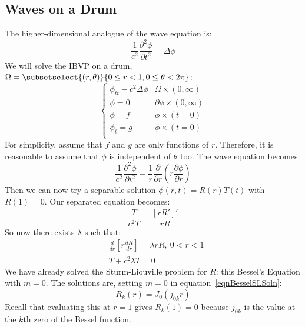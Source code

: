 \documentclass[../Main.tex]{subfiles}
\begin{document}
\subsection{Waves on a Drum}
The higher-dimensional analogue of the wave equation is:
\begin{equation}
    \frac{1}{c^2} \frac{\partial^{2}\phi}{\partial t^{2}} = \Delta \phi
    \label{eqnWave3D}
\end{equation}
We will solve the IBVP on a drum, $\Omega = \subsetselect{(r, \theta)}{0 \leq r < 1, 0 \leq \theta < 2\pi}$:
\begin{equation}
    \begin{cases}
        \phi_{tt} - c^2 \Delta \phi & \Omega \times (0, \infty) \\
        \phi = 0 & \partial \phi \times (0, \infty) \\
        \phi = f & \phi \times (t = 0) \\
        \phi_t = g & \phi \times (t = 0) \\
    \end{cases}
    \label{eqnWaveDrum}
\end{equation}
For simplicity, assume that $f$ and $g$ are only functions of $r$. Therefore, it is reasonable to assume that $\phi$ is independent of $\theta$ too. The wave equation becomes:
\begin{equation*}
    \frac{1}{c^2} \frac{\partial^{2}\phi}{\partial t^{2}} = \frac{1}{r} \frac{\partial}{\partial r}\left(r \frac{\partial \phi}{\partial r}\right)
\end{equation*}
Then we can now try a separable solution $\phi(r, t) = R(r) T(t)$ with $R(1) = 0$. Our separated equation becomes:
\begin{equation*}
    \frac{\ddot{T}}{c^2 T} = \frac{[rR']'}{rR}
\end{equation*}
So now there exists $\lambda$ such that:
\begin{align*}
    &\frac{d}{dr}\left[r \frac{dR}{dr}\right] = \lambda rR,~0 < r < 1 \\
    &\ddot{T} + c^2 \lambda T = 0
\end{align*}
We have already solved the Sturm-Liouville problem for $R$: this Bessel's Equation with $m = 0$. The solutions are, setting $m = 0$ in equation~\ref{eqnBesselSLSoln}:
\begin{equation*}
    R_k(r) = J_{0}(j_{0k} r)
\end{equation*}
Recall that evaluating this at $r = 1$ gives $R_k(1) = 0$ because $j_{0k}$ is the value at the $k$th zero of the Bessel function.
\end{document}
